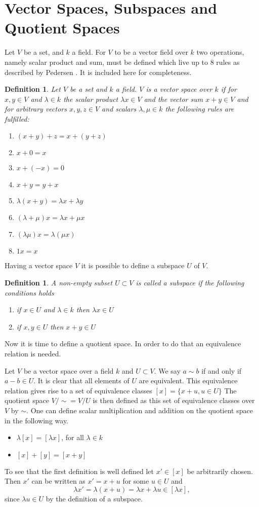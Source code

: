 \documentclass[11pt,a4paper,twoside]{report}
\newtheorem{mydef}[mythm]{Definition}
\begin{document}
\section{Vector Spaces, Subspaces and Quotient Spaces}
Let $V$ be a set, and $k$ a field. For $V$ to be a vector field over $k$ two operations, namely scalar product and sum, must be defined which live up to 8 rules as described by Pedersen \cite[pp. 85-86]{LinAlg}. It is included here for completeness.
\begin{mydef} 
Let $V$ be a set and $k$ a field. $V$ is a vector space over $k$ if for $x,y\in V$ and $\lambda\in k$ the scalar product $\lambda x\in V$ and the vector sum $x+y\in V$ and for arbitrary vectors $x,y,z\in V$ and scalars $\lambda,\mu\in k$ the following rules are fulfilled:
\begin{enumerate}
\item $(x+y)+z = x+(y+z)$
\item $x+0=x$
\item $x+(-x)=0$
\item $x+y=y+x$
\item $\lambda(x+y)=\lambda x+\lambda y$
\item $(\lambda+\mu)x=\lambda x + \mu x$
\item $(\lambda\mu)x=\lambda(\mu x)$
\item $1x=x$
\end{enumerate}
\end{mydef}
Having a vector space $V$ it is possible to define a subspace $U$ of $V$.\cite[p.93]{LinAlg}
\begin{mydef}
A non-empty subset $U\subset V$ is called a subspace if the following conditions holds
\begin{enumerate}
\item if $x\in U$ and $\lambda\in k$ then $\lambda x\in U$
\item if $x,y\in U$ then $x+y\in U$
\end{enumerate} 
\end{mydef}
Now it is time to define a quotient space. In order to do that an equivalence relation is needed. 

Let $V$ be a vector space over a field $k$ and $U\subset V$. We say $a\sim b$ if and only if $a-b\in U$. It is clear that all elements of $U$ are equivalent.
This equivalence relation gives rise to a set of equivalence classes $[x]=\{x+u,u\in U\}$
The quotient space $V/\sim = V/U$ is then defined as this set of equivalence classes over $V$ by $\sim$.
One can define scalar multiplication and addition on the quotient space in the following way. \cite{wikiQuo}
\begin{itemize}
\item $\lambda[x]=[\lambda x]$, for all $\lambda\in k$
\item $[x]+[y]=[x+y]$
\end{itemize}
To see that the first definition is well defined let $x'\in[x]$ be arbitrarily chosen. Then $x'$ can be written as $x'=x+u$ for some $u\in U$ and 
\begin{equation*}
\lambda x' = \lambda (x + u) = \lambda x + \lambda u \in [\lambda x],
\end{equation*}
since $\lambda u \in U$ by the definition of a subspace.
\end{document}
